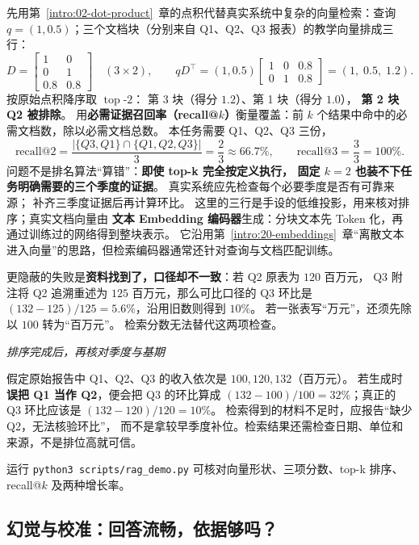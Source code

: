 先用第~\ref*{intro:02-dot-product}~章的点积代替真实系统中复杂的向量检索：查询
$q=(1,0.5)$；三个文档块（分别来自 Q1、Q2、Q3 报表）的教学向量排成三行：
\[
D=\begin{bmatrix}1&0\\0&1\\0.8&0.8\end{bmatrix}
\quad(3\times2),\qquad
qD^\top
=(1,0.5)
\begin{bmatrix}1&0&0.8\\0&1&0.8\end{bmatrix}
=\boxed{(1,\;0.5,\;1.2)}.
\]
按原始点积降序取 $\operatorname{top}\text{-}2$：
第 3 块（得分 $1.2$）、第 1 块（得分 $1.0$），
\textbf{第 2 块 Q2 被排除}。
\label{concept:recall-at-k}%
用\textbf{必需证据召回率（recall@$k$）}衡量覆盖：前 $k$ 个结果中命中的必需文档数，除以必需文档总数。
本任务需要 Q1、Q2、Q3 三份，
\[
\text{recall@}2=\frac{|\{Q3,Q1\}\cap\{Q1,Q2,Q3\}|}{3}=\frac23\approx\boxed{66.7\%},\qquad
\text{recall@}3=\frac33=100\%.
\]
问题不是排名算法“算错”：\textbf{即使 top-k 完全按定义执行，
固定 $k=2$ 也装不下任务明确需要的三个季度的证据}。
真实系统应先检查每个必要季度是否有可靠来源；
补齐三季度证据后再计算环比。
这里的三行是手设的低维投影，用来核对排序；真实文档向量由
\textbf{文本 Embedding 编码器}生成：分块文本先 Token 化，再通过训练过的网络得到整块表示。
它沿用第~\ref*{intro:20-embeddings}~章“离散文本进入向量”的思路，但检索编码器通常还针对查询与文档匹配训练。

更隐蔽的失败是\textbf{资料找到了，口径却不一致}：若 Q2 原表为 $120$ 百万元，
Q3 附注将 Q2 追溯重述为 $125$ 百万元，那么可比口径的 Q3 环比是
$(132-125)/125=5.6\%$，沿用旧数则得到 $10\%$。
若一张表写“万元”，还须先除以 $100$ 转为“百万元”。
检索分数无法替代这两项检查。

\begin{example}
\noindent\emph{排序完成后，再核对季度与基期}\par
假定原始报告中 Q1、Q2、Q3 的收入依次是 $100,120,132$（百万元）。
若生成时\textbf{误把 Q1 当作 Q2}，便会把 Q3 的环比算成
$(132-100)/100=\boxed{32\%}$；真正的 Q3 环比应该是
$(132-120)/120=\boxed{10\%}$。
检索得到的材料不足时，应报告“缺少 Q2，无法核验环比”，
而不是拿较早季度补位。检索结果还需检查日期、单位和来源，不是排位高就可信。
\end{example}

运行 \texttt{python3 scripts/rag\_demo.py} 可核对向量形状、三项分数、top-k 排序、recall@$k$ 及两种增长率。


\subsection{幻觉与校准：回答流畅，依据够吗？}
\label{concept:hallucination-calibration}

